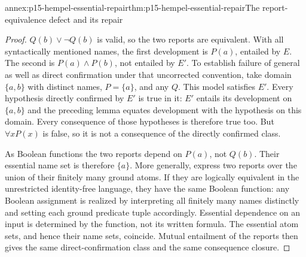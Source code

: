 \begin{annexitem}{annex:p15-hempel-essential-repair}{thm:p15-hempel-essential-repair}{The report-equivalence defect and its repair}
\begin{proof}
$Q(b)\lor\neg Q(b)$ is valid, so the two reports are equivalent.
With all syntactically mentioned names, the first development is $P(a)$,
entailed by $E$. The second is $P(a)\land P(b)$, not entailed by $E'$.
To establish failure of general as well as direct confirmation under that
uncorrected convention, take domain $\{a,b\}$ with distinct names,
$P=\{a\}$, and any $Q$. This model satisfies $E'$. Every hypothesis
directly confirmed by $E'$ is true in it: $E'$ entails its development
on $\{a,b\}$ and the preceding lemma equates development with the
hypothesis on this domain. Every consequence of those hypotheses is
therefore true too. But $\forall xP(x)$ is false, so it is not a
consequence of the directly confirmed class.

As Boolean functions the two reports depend on $P(a)$, not $Q(b)$.
Their essential name set is therefore $\{a\}$. More generally, express
two reports over the union of their finitely many ground atoms. If
they are logically equivalent in the unrestricted identity-free
language, they have the same Boolean function: any Boolean assignment
is realized by interpreting all finitely many names distinctly and
setting each ground predicate tuple accordingly. Essential dependence
on an input is determined by the function, not its written formula.
The essential atom sets, and hence their name sets, coincide. Mutual
entailment of the reports then gives the same direct-confirmation
class and the same consequence closure.
\end{proof}
\end{annexitem}


